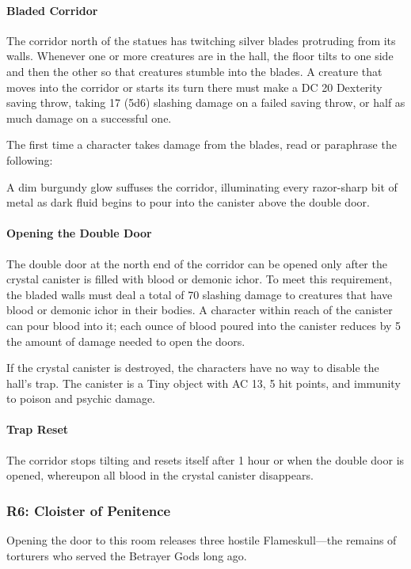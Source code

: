 \documentclass[10pt,a4paper,twoside,bg=print,twocolumn,openany,nodeprecatedcode]{dndbook}
\begin{document}
\paragraph{Bladed Corridor}
The corridor north of the statues has twitching silver blades protruding from its walls. Whenever one or more creatures are in the hall, the floor tilts to one side and then the other so that creatures stumble into the blades. A creature that moves into the corridor or starts its turn there must make a DC 20 Dexterity saving throw, taking 17 (5d6) slashing damage on a failed saving throw, or half as much damage on a successful one.

The first time a character takes damage from the blades, read or paraphrase the following:

\begin{DndReadAloud}{}
A dim burgundy glow suffuses the corridor, illuminating every razor-sharp bit of metal as dark fluid begins to pour into the canister above the double door.

\end{DndReadAloud}

\paragraph{Opening the Double Door}
The double door at the north end of the corridor can be opened only after the crystal canister is filled with blood or demonic ichor. To meet this requirement, the bladed walls must deal a total of 70 slashing damage to creatures that have blood or demonic ichor in their bodies. A character within reach of the canister can pour blood into it; each ounce of blood poured into the canister reduces by 5 the amount of damage needed to open the doors.

If the crystal canister is destroyed, the characters have no way to disable the hall's trap. The canister is a Tiny object with AC 13, 5 hit points, and immunity to poison and psychic damage.

\paragraph{Trap Reset}
The corridor stops tilting and resets itself after 1 hour or when the double door is opened, whereupon all blood in the crystal canister disappears.



\subsubsection{R6: Cloister of Penitence}
Opening the door to this room releases three hostile Flameskull—the remains of torturers who served the Betrayer Gods long ago.
\end{document}
